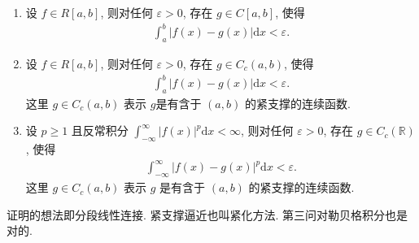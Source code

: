 \documentclass[../../main.tex]{subfiles}
\begin{document}
\begin{theorem}[可积被连续函数逼近]\label{theorem:可积被连续函数逼近}
\begin{enumerate}[(1)]
\item 设 $f \in R[a,b]$, 则对任何 $\varepsilon > 0$, 存在 $g \in C[a,b]$, 使得
\begin{align}
\int_{a}^{b} |f(x) - g(x)|\mathrm{d}x < \varepsilon. \label{theorem:可积被连续函数逼近-13.117}
\end{align}

\item 设 $f \in R[a,b]$, 则对任何 $\varepsilon > 0$, 存在 $g \in C_c(a,b)$, 使得
\begin{align*}
\int_{a}^{b} |f(x) - g(x)|\mathrm{d}x < \varepsilon. 
\end{align*}
这里 $g\in C_c(a,b)$ 表示 $g$是有含于 $(a,b)$ 的紧支撑的连续函数.

\item 设 $p \geqslant 1$ 且反常积分 $\int_{-\infty}^{\infty} |f(x)|^{p}\mathrm{d}x < \infty$, 则对任何 $\varepsilon > 0$, 存在 $g \in C_c(\mathbb{R})$, 使得
\begin{align*}
\int_{-\infty}^{\infty} |f(x) - g(x)|^{p}\mathrm{d}x < \varepsilon.
\end{align*}
这里 $g\in C_c(a,b)$ 表示 $g$ 是有含于 $(a,b)$ 的紧支撑的连续函数.
\end{enumerate}
\end{theorem}
\begin{note}
证明的想法即分段线性连接. 紧支撑逼近也叫紧化方法. 第三问对勒贝格积分也是对的.
\end{note}
\end{document}
